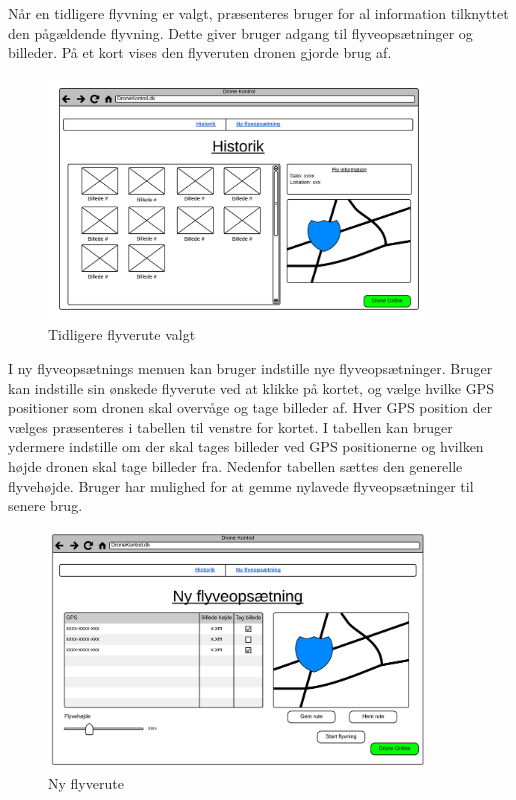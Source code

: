 Når en tidligere flyvning er valgt, præsenteres bruger for al information tilknyttet den pågældende flyvning. Dette giver bruger adgang til flyveopsætninger og billeder. På et kort vises den flyveruten dronen gjorde brug af.

\vspace{-5pt}
\begin{figure}[H]
	\centering
	\includegraphics[width=0.9\textwidth]{Billeder/UI_mockups/archive_choosen.png}
	\vspace{-.5cm}
	\caption{Tidligere flyverute valgt}
	\label{fig:mockup_archive_choosen}
\end{figure}


I ny flyveopsætnings menuen kan bruger indstille nye flyveopsætninger. 
Bruger kan indstille sin ønskede flyverute ved at klikke på kortet, og vælge hvilke GPS positioner som dronen skal overvåge og tage billeder af. 
Hver GPS position der vælges præsenteres i tabellen til venstre for kortet. 
I tabellen kan bruger ydermere indstille om der skal tages billeder ved GPS positionerne og hvilken højde dronen skal tage billeder fra. Nedenfor tabellen sættes den generelle flyvehøjde.
Bruger har mulighed for at gemme nylavede flyveopsætninger til senere brug.

\vspace{-5pt}
\begin{figure}[H]
	\centering
	\includegraphics[width=0.9\textwidth]{Billeder/UI_mockups/setup_new_flight.png}
	\vspace{-.2cm}
	\caption{Ny flyverute}
	\label{fig:mockup_setup_new_flight}
\end{figure}

 